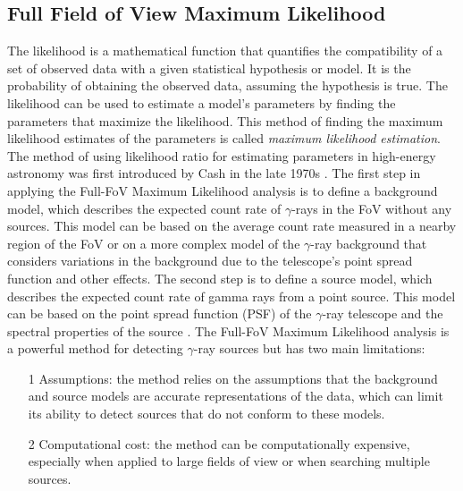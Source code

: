 \subsection{Full Field of View Maximum Likelihood}
\label{ss:ffov-ml}
The likelihood is a mathematical function that quantifies the compatibility of a set of observed data with a given statistical hypothesis or model. It is the probability of obtaining the observed data, assuming the hypothesis is true. The likelihood can be used to estimate a model's parameters by finding the parameters that maximize the likelihood. This method of finding the maximum likelihood estimates of the parameters is called \textit{maximum likelihood estimation}. The method of using likelihood ratio for estimating parameters in high-energy astronomy was first introduced by Cash in the late 1970s \cite{cash_1979}. The first step in applying the Full-FoV Maximum Likelihood analysis is to define a background model, which describes the expected count rate of $\gamma$-rays in the FoV without any sources. This model can be based on the average count rate measured in a nearby region of the FoV or on a more complex model of the $\gamma$-ray background that considers variations in the background due to the telescope's point spread function and other effects. The second step is to define a source model, which describes the expected count rate of gamma rays from a point source. This model can be based on the point spread function (PSF) of the $\gamma$-ray telescope and the spectral properties of the source \cite{di2020detection}. The Full-FoV Maximum Likelihood analysis is a powerful method for detecting $\gamma$-ray sources but has two main limitations:
\begin{itemize}
    \item[1] Assumptions: the method relies on the assumptions that the background and source models are accurate representations of the data, which can limit its ability to detect sources that do not conform to these models.
    \item[2] Computational cost: the method can be computationally expensive, especially when applied to large fields of view or when searching multiple sources.
\end{itemize}
